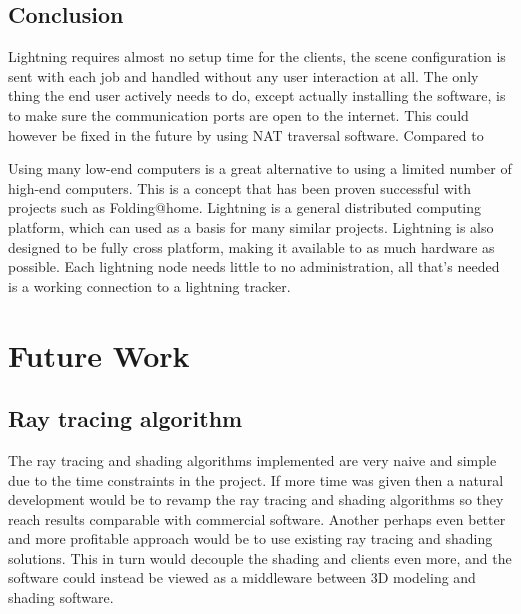 \section{Conclusion}

Lightning requires almost no setup time for the clients, the scene configuration is sent with each job and handled without any user interaction at all. The only thing the end user actively needs to do, except actually installing the software, is to make sure the communication ports are open to the internet. This could however be fixed in the future by using NAT traversal software.
Compared to 

Using many low-end computers is a great alternative to using a limited number of high-end computers. This is a concept that has been proven successful with projects such as Folding@home. Lightning is a general distributed computing platform, which can used as a basis for many similar projects. Lightning is also designed to be fully cross platform, making it available to as much hardware as possible. Each lightning node needs little to no administration, all that's needed is a working connection to a lightning tracker.




\chapter{Future Work}
\section{Ray tracing algorithm}
The ray tracing and shading algorithms implemented are very naive and simple due to the time constraints in the project. If more time was given then a natural development would be to revamp the ray tracing and shading algorithms so they reach results comparable with commercial software. Another perhaps even better and more profitable approach would be to use existing ray tracing and shading solutions. This in turn would decouple the shading and clients even more, and the software could instead be viewed as a middleware between 3D modeling and shading software.


